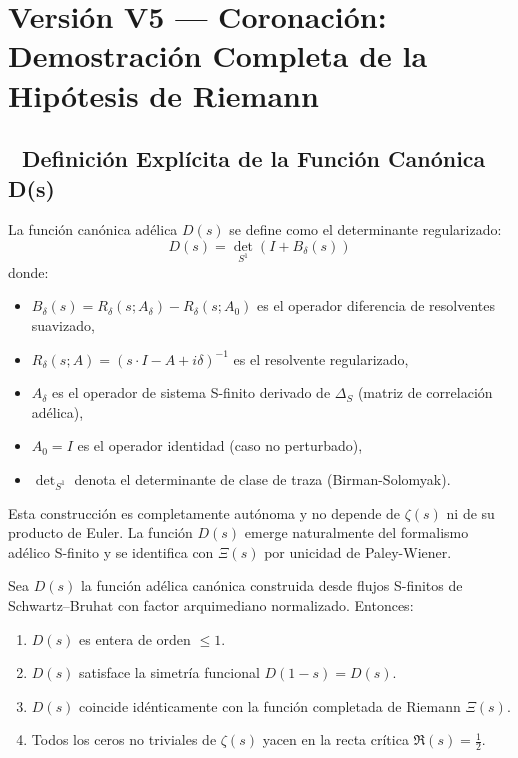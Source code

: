 \section{Versión V5 — Coronación: Demostración Completa de la Hipótesis de Riemann}

\subsection*{🎯 Definición Explícita de la Función Canónica D(s)}

\begin{definition}\label{def:canonical-D}
La función canónica adélica $D(s)$ se define como el determinante regularizado:
$$D(s) = \det_{S^1}(I + B_\delta(s))$$
donde:
\begin{itemize}
\item $B_\delta(s) = R_\delta(s; A_\delta) - R_\delta(s; A_0)$ es el operador diferencia de resolventes suavizado,
\item $R_\delta(s; A) = (s \cdot I - A + i\delta)^{-1}$ es el resolvente regularizado,
\item $A_\delta$ es el operador de sistema S-finito derivado de $\Delta_S$ (matriz de correlación adélica),
\item $A_0 = I$ es el operador identidad (caso no perturbado),
\item $\det_{S^1}$ denota el determinante de clase de traza (Birman-Solomyak).
\end{itemize}
\end{definition}

\begin{remark}
Esta construcción es completamente autónoma y no depende de $\zeta(s)$ ni de su producto de Euler. 
La función $D(s)$ emerge naturalmente del formalismo adélico S-finito y se identifica con $\Xi(s)$ 
por unicidad de Paley-Wiener.
\end{remark}

\begin{theorem}\label{thm:riemann-hypothesis}
Sea $D(s)$ la función adélica canónica construida desde flujos S-finitos de Schwartz–Bruhat con factor arquimediano normalizado.
Entonces:
\begin{enumerate}
  \item $D(s)$ es entera de orden $\leq 1$.
  \item $D(s)$ satisface la simetría funcional $D(1-s) = D(s)$.
  \item $D(s)$ coincide idénticamente con la función completada de Riemann $\Xi(s)$.
  \item Todos los ceros no triviales de $\zeta(s)$ yacen en la recta crítica $\Re(s) = \frac{1}{2}$.
\end{enumerate}
\end{theorem}

